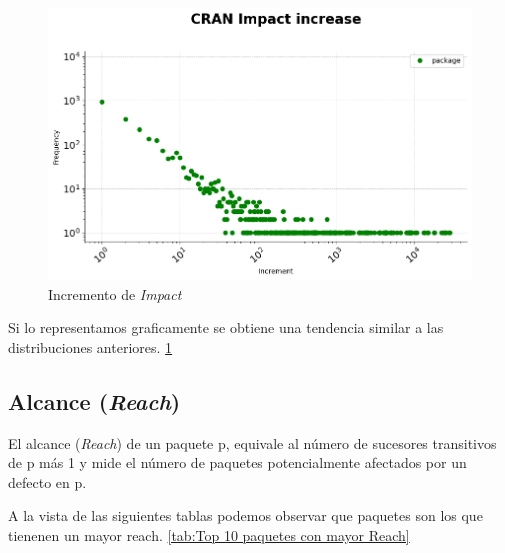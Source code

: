 \begin{figure}[ht!]
    \begin{center}
        \includegraphics[width=1\textwidth]{img/cran/impact_increase_dist.png}
        \caption{Incremento de \textit{Impact}}
        \label{fig:Incremento de Impact}
    \end{center}
\end{figure}

Si lo representamos graficamente se obtiene una tendencia similar a las distribuciones anteriores. \ref{fig:Incremento de Impact}

\subsection{Alcance (\textit{Reach})}

El alcance (\textit{Reach}) de un paquete p, equivale al número de sucesores transitivos
de p más 1 y mide el número de paquetes potencialmente afectados
por un defecto en p.

A la vista de las siguientes tablas podemos observar que  paquetes
son los que tienenen un mayor reach. \ref{tab:Top 10 paquetes con mayor Reach}

